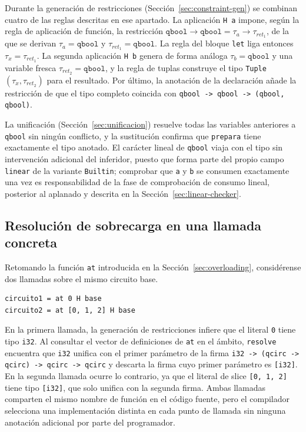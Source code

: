 Durante la generación de restricciones (Sección~\ref{sec:constraint-gen}) se combinan cuatro de las reglas descritas en ese apartado. La aplicación \lstinline|H a| impone, según la regla de aplicación de función, la restricción $\mathtt{qbool} \to \mathtt{qbool} = \tau_a \to \tau_{ret_1}$, de la que se derivan $\tau_a = \mathtt{qbool}$ y $\tau_{ret_1} = \mathtt{qbool}$. La regla del bloque \lstinline|let| liga entonces $\tau_x = \tau_{ret_1}$. La segunda aplicación \lstinline|H b| genera de forma análoga $\tau_b = \mathtt{qbool}$ y una variable fresca $\tau_{ret_2} = \mathtt{qbool}$, y la regla de tuplas construye el tipo \lstinline|Tuple|$(\tau_x, \tau_{ret_2})$ para el resultado. Por último, la anotación de la declaración añade la restricción de que el tipo completo coincida con \lstinline|qbool -> qbool -> (qbool, qbool)|.

La unificación (Sección~\ref{sec:unificacion}) resuelve todas las variables anteriores a \lstinline|qbool| sin ningún conflicto, y la sustitución confirma que \lstinline|prepara| tiene exactamente el tipo anotado. El carácter lineal de \lstinline|qbool| viaja con el tipo sin intervención adicional del inferidor, puesto que forma parte del propio campo \lstinline|linear| de la variante \lstinline|Builtin|; comprobar que \lstinline|a| y \lstinline|b| se consumen exactamente una vez es responsabilidad de la fase de comprobación de consumo lineal, posterior al aplanado y descrita en la Sección~\ref{sec:linear-checker}.

\subsection{Resolución de sobrecarga en una llamada concreta}

Retomando la función \lstinline|at| introducida en la Sección~\ref{sec:overloading}, considérense dos llamadas sobre el mismo circuito base.

\begin{lstlisting}[language={}, caption=Dos llamadas a la función sobrecargada at resueltas con distinta firma]
circuito1 = at 0 H base
circuito2 = at [0, 1, 2] H base
\end{lstlisting}

En la primera llamada, la generación de restricciones infiere que el literal \lstinline|0| tiene tipo \lstinline|i32|. Al consultar el vector de definiciones de \lstinline|at| en el ámbito, \lstinline|resolve| encuentra que \lstinline|i32| unifica con el primer parámetro de la firma \lstinline|i32 -> (qcirc -> qcirc) -> qcirc -> qcirc| y descarta la firma cuyo primer parámetro es \lstinline|[i32]|. En la segunda llamada ocurre lo contrario, ya que el literal de slice \lstinline|[0, 1, 2]| tiene tipo \lstinline|[i32]|, que solo unifica con la segunda firma. Ambas llamadas comparten el mismo nombre de función en el código fuente, pero el compilador selecciona una implementación distinta en cada punto de llamada sin ninguna anotación adicional por parte del programador.

